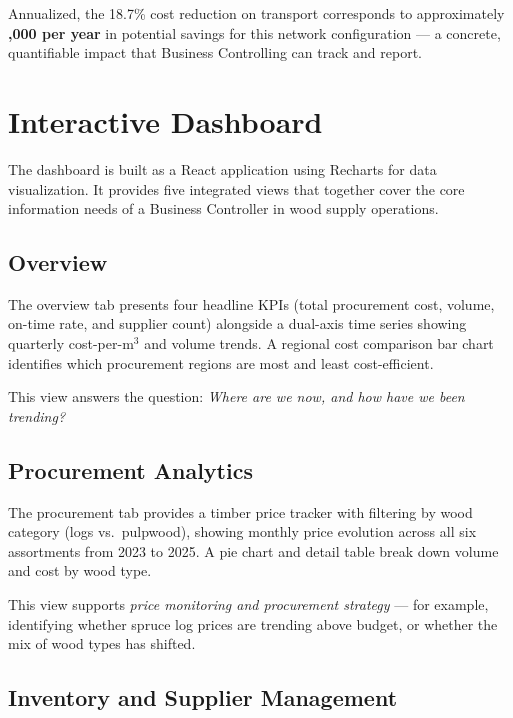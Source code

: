 \documentclass[11pt,a4paper]{article}
\begin{document}
Annualized, the 18.7\% cost reduction on transport corresponds to approximately \textbf{,000 per year} in potential savings for this network configuration --- a concrete, quantifiable impact that Business Controlling can track and report.


\section{Interactive Dashboard}

The dashboard is built as a React application using Recharts for data visualization. It provides five integrated views that together cover the core information needs of a Business Controller in wood supply operations.

\subsection{Overview}

The overview tab presents four headline KPIs (total procurement cost, volume, on-time rate, and supplier count) alongside a dual-axis time series showing quarterly cost-per-m$^3$ and volume trends. A regional cost comparison bar chart identifies which procurement regions are most and least cost-efficient.

This view answers the question: \textit{Where are we now, and how have we been trending?}

\subsection{Procurement Analytics}

The procurement tab provides a timber price tracker with filtering by wood category (logs vs.\ pulpwood), showing monthly price evolution across all six assortments from 2023 to 2025. A pie chart and detail table break down volume and cost by wood type.

This view supports \textit{price monitoring and procurement strategy} --- for example, identifying whether spruce log prices are trending above budget, or whether the mix of wood types has shifted.

\subsection{Inventory and Supplier Management}
\end{document}
